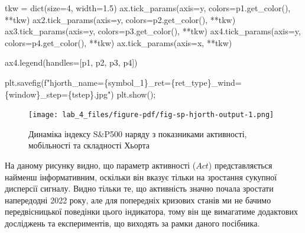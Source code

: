 \documentclass[
  letterpaper,
]{report}
\newenvironment{Shaded}{\begin{snugshade}}{\end{snugshade}}
\newcommand{\BuiltInTok}[1]{\textcolor[rgb]{0.00,0.23,0.31}{#1}}
\newcommand{\DecValTok}[1]{\textcolor[rgb]{0.68,0.00,0.00}{#1}}
\newcommand{\FloatTok}[1]{\textcolor[rgb]{0.68,0.00,0.00}{#1}}
\newcommand{\NormalTok}[1]{\textcolor[rgb]{0.00,0.23,0.31}{#1}}
\newcommand{\OperatorTok}[1]{\textcolor[rgb]{0.37,0.37,0.37}{#1}}
\newcommand{\SpecialCharTok}[1]{\textcolor[rgb]{0.37,0.37,0.37}{#1}}
\newcommand{\SpecialStringTok}[1]{\textcolor[rgb]{0.13,0.47,0.30}{#1}}
\newcommand{\StringTok}[1]{\textcolor[rgb]{0.13,0.47,0.30}{#1}}
\begin{document}
\begin{Shaded}
\begin{Highlighting}[]
\NormalTok{tkw }\OperatorTok{=} \BuiltInTok{dict}\NormalTok{(size}\OperatorTok{=}\DecValTok{4}\NormalTok{, width}\OperatorTok{=}\FloatTok{1.5}\NormalTok{)}
\NormalTok{ax.tick\_params(axis}\OperatorTok{=}\StringTok{\textquotesingle{}y\textquotesingle{}}\NormalTok{, colors}\OperatorTok{=}\NormalTok{p1.get\_color(), }\OperatorTok{**}\NormalTok{tkw)}
\NormalTok{ax2.tick\_params(axis}\OperatorTok{=}\StringTok{\textquotesingle{}y\textquotesingle{}}\NormalTok{, colors}\OperatorTok{=}\NormalTok{p2.get\_color(), }\OperatorTok{**}\NormalTok{tkw)}
\NormalTok{ax3.tick\_params(axis}\OperatorTok{=}\StringTok{\textquotesingle{}y\textquotesingle{}}\NormalTok{, colors}\OperatorTok{=}\NormalTok{p3.get\_color(), }\OperatorTok{**}\NormalTok{tkw)}
\NormalTok{ax4.tick\_params(axis}\OperatorTok{=}\StringTok{\textquotesingle{}y\textquotesingle{}}\NormalTok{, colors}\OperatorTok{=}\NormalTok{p4.get\_color(), }\OperatorTok{**}\NormalTok{tkw)}
\NormalTok{ax.tick\_params(axis}\OperatorTok{=}\StringTok{\textquotesingle{}x\textquotesingle{}}\NormalTok{, }\OperatorTok{**}\NormalTok{tkw)}

\NormalTok{ax4.legend(handles}\OperatorTok{=}\NormalTok{[p1, p2, p3, p4])}

\NormalTok{plt.savefig(}\SpecialStringTok{f"hjorth\_name=}\SpecialCharTok{\{}\NormalTok{symbol\_1}\SpecialCharTok{\}}\SpecialStringTok{\_ret=}\SpecialCharTok{\{}\NormalTok{ret\_type}\SpecialCharTok{\}}\SpecialStringTok{\_wind=}\SpecialCharTok{\{}\NormalTok{window}\SpecialCharTok{\}}\SpecialStringTok{\_step=}\SpecialCharTok{\{}\NormalTok{tstep}\SpecialCharTok{\}}\SpecialStringTok{.jpg"}\NormalTok{)}
\NormalTok{plt.show()}\OperatorTok{;}
\end{Highlighting}
\end{Shaded}

\begin{figure}[H]

{\centering \texttt{[image: lab\_4\_files/figure-pdf/fig-sp-hjorth-output-1.png]}

}

\caption{\label{fig-sp-hjorth}Динаміка індексу S\&P500 наряду з
показниками активності, мобільності та складності Хьорта}

\end{figure}

На даному рисунку видно, що параметр активності (\(Act\))
представляється найменш інформативним, оскільки він вказує тільки на
зростання сукупної дисперсії сигналу. Видно тільки те, що активність
значно почала зростати напередодні 2022 року, але для попередніх
кризових станів ми не бачимо передвісницької поведінки цього індикатора,
тому він ще вимагатиме додактових досліджень та експериментів, що
виходять за рамки даного посібника.
\end{document}
